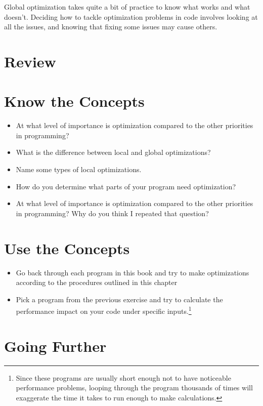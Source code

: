 Global optimization takes quite a bit of practice to know what works and
what doesn't.  Deciding how to tackle optimization problems in code involves
looking at all the issues, and knowing that fixing some issues may cause others.

\section{Review}

\section{Know the Concepts}


\begin{itemize}\item At what level of importance is optimization compared to the other priorities in programming? 
\item What is the difference between local and global optimizations? 
\item Name some types of local optimizations. 
\item How do you determine what parts of your program need optimization? 
\item At what level of importance is optimization compared to the other priorities in programming?  Why do you think I repeated that question? 
\end{itemize}

\section{Use the Concepts}

\begin{itemize}\item Go back through each program in this book and try to make optimizations according to the procedures outlined in this chapter 
\item Pick a program from the previous exercise and try to calculate the performance impact on your code under specific inputs.\footnote{Since these programs are usually short enough not to have noticeable performance problems, looping through the program thousands of times will exaggerate the time it takes to run enough to make calculations.} 
\end{itemize}

\section{Going Further}

